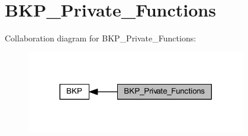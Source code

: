 \hypertarget{group___b_k_p___private___functions}{}\section{B\+K\+P\+\_\+\+Private\+\_\+\+Functions}
\label{group___b_k_p___private___functions}
Collaboration diagram for B\+K\+P\+\_\+\+Private\+\_\+\+Functions\+:
\nopagebreak
\begin{figure}[H]
\begin{center}
\leavevmode
\includegraphics[width=272pt]{group___b_k_p___private___functions}
\end{center}
\end{figure}
